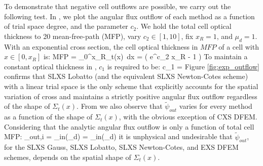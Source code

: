 To demonstrate that negative cell outflows are possible, we carry out the following test.
In , we plot the angular flux outflow of each method as a function of trial space degree, and the parameter $c_2$.
We hold the total cell optical thickness to 20 mean-free-path (MFP), vary $c_2 \in [1,10]$, fix $x_R=1$, and $\mu_d =1$.
With an exponential cross section, the cell optical thickness in $MFP$ of a cell  with $x\in[0,x_R]$ is:
\benum
MFP = \int_{0}^{x_R}{\Sigma_t(x)~dx} = \left( e^{c_2 x_R} - 1 \right) \pep
\label{eq:mfp_tot} 
\eenum
To maintain a constant optical thickness in , $c_1$ is required to be:
\benum
c_1 = \pep
\eenum
%
%
%
%
Figure \ref{fig:exp_outflow} confirms that  SLXS Lobatto (and the equivalent SLXS Newton-Cotes scheme) with a linear trial space is the only scheme that explicitly accounts for the spatial variation of cross and maintains a strictly positive angular flux outflow regardless of the shape of $\Sigma_t(x)$.
From  we also observe that $\widetilde{\psi}_{out}$ varies for every method as a function of the shape of $\Sigma_t(x)$, with the obvious exception of CXS DFEM.
Considering that the analytic angular flux outflow is only a function of total cell MFP:
\benum
\label{eq:outflow_truth}
\psi_{out,i} = \psi_{in}(\mu_d) \exp{} = \psi_{in}(\mu_d) \exp{} \pec
\eenum
it is unphysical and undesirable that $\widetilde{\psi}_{out}$, for the SLXS Gauss, SLXS Lobatto, SLXS Newton-Cotes, and EXS DFEM schemes, depends on the spatial shape of $\Sigma_t(x)$.

